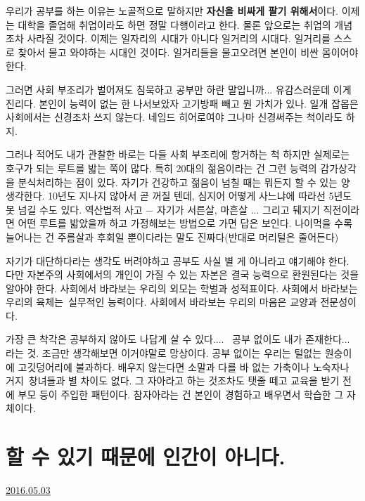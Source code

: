 우리가 공부를 하는 이유는 노골적으로 말하지만 \textbf{자신을 비싸게 팔기 위해서}이다.
이제는 대학을 졸업해 취업이라도 하면 정말 다행이라고 한다. 물론 앞으로는 취업의 개념조차 사라질 것이다.
이제는 일자리의 시대가 아니다 일거리의 시대다. 일거리를 스스로 찾아서 물고 와야하는 시대인 것이다.
일거리들을 물고오려면 본인이 비싼 몸이어야 한다.
\vspace{5mm}

그러면 사회 부조리가 벌어져도 침묵하고 공부만 하란 말입니까... 유감스러운데 이게 진리다.
본인이 능력이 없는 한 나서보았자 고기방패 빼고 뭔 가치가 있나.
일개 잡몹은 사회에서는 신경조차 쓰지 않는다. 네임드 히어로여야 그나마 신경써주는 척이라도 하지.
\vspace{5mm}

그러나 적어도 내가 관찰한 바로는 다들 사회 부조리에 항거하는 척 하지만 실제로는 호구가 되는 루트를 밟는 쪽이 많다.
특히 20대의 젊음이라는 건 그런 능력의 감가상각을 분식처리하는 점이 있다. 자기가 건강하고 젊음이 넘칠 때는 뭐든지 할 수 있는 양 생각한다.
10년도 지나지 않아서 곧 꺼질 텐데, 심지어 어떻게 사느냐에 따라선 5년도 못 넘길 수도 있다.
역산법적 사고 $-$ 자기가 서른살, 마흔살 ... 그리고 뒈지기 직전이라면 어떤 루트를 밟았을까 하고 가정해보는 방법으로 가면 답은 보인다.
나이먹을 수록 늘어나는 건 주름살과 후회일 뿐이다라는 말도 진짜다(반대로 머리털은 줄어든다)
\vspace{5mm}

자기가 대단하다라는 생각도 버려야하고 공부도 사실 별 게 아니라고 얘기해야 한다.
다만 자본주의 사회에서의 개인이 가질 수 있는 자본은 결국 능력으로 환원된다는 것을 알아야 한다.
사회에서 바라보는 우리의 외모는 학벌과 성적표이다.
사회에서 바라보는 우리의 육체는 실무적인 능력이다.
사회에서 바라보는 우리의 마음은 교양과 전문성이다.
\vspace{5mm}

가장 큰 착각은 공부하지 않아도 나답게 살 수 있다....  공부 없이도 내가 존재한다... 라는 것.
조금만 생각해보면 이거야말로 망상이다. 공부 없이는 우리는 털없는 원숭이에 고깃덩어리에 불과하다.
배우지 않는다면 소말과 다를 바 없는 가축이나 노숙자나 거지 창녀들과 별 차이도 없다.
그 자아라고 하는 것조차도 탯줄 떼고 교육을 받기 전에 부모 등이 주입한 패턴이다.
참자아라는 건 본인이 경험하고 배우면서 학습한 그 자체이다.
\vspace{5mm}






\section{할 수 있기 때문에 인간이 아니다.}
\href{https://www.kockoc.com/Apoc/758394}{2016.05.03}

